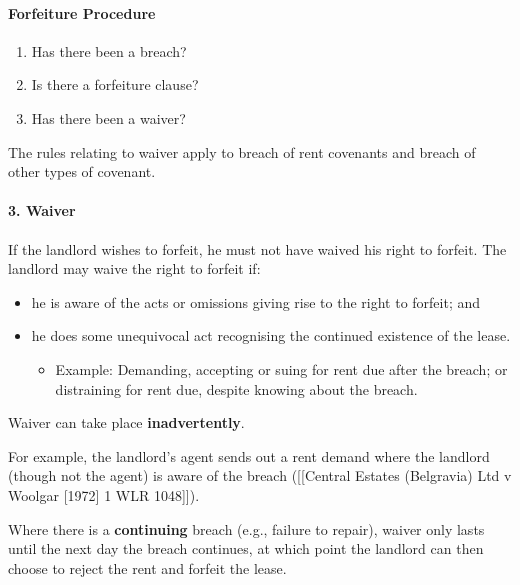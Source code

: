 \documentclass[
]{article}
\providecommand{\tightlist}{%
  \setlength{\itemsep}{0pt}\setlength{\parskip}{0pt}}
\begin{document}
\hypertarget{forfeiture-procedure}{%
\paragraph{Forfeiture Procedure}\label{forfeiture-procedure}}

\begin{enumerate}
\def\labelenumi{\arabic{enumi}.}
\tightlist
\item
  Has there been a breach?
\item
  Is there a forfeiture clause?
\item
  Has there been a waiver?
\end{enumerate}

The rules relating to waiver apply to breach of rent covenants and
breach of other types of covenant.

\hypertarget{waiver}{%
\paragraph{3. Waiver}\label{waiver}}

If the landlord wishes to forfeit, he must not have waived his right to
forfeit. The landlord may waive the right to forfeit if:

\begin{itemize}
\tightlist
\item
  he is aware of the acts or omissions giving rise to the right to
  forfeit; and
\item
  he does some unequivocal act recognising the continued existence of
  the lease.

  \begin{itemize}
  \tightlist
  \item
    Example: Demanding, accepting or suing for rent due after the
    breach; or distraining for rent due, despite knowing about the
    breach.
  \end{itemize}
\end{itemize}

Waiver can take place \textbf{inadvertently}.

For example, the landlord's agent sends out a rent demand where the
landlord (though not the agent) is aware of the breach ({[}{[}Central
Estates (Belgravia) Ltd v Woolgar {[}1972{]} 1 WLR 1048{]}{]}).

Where there is a \textbf{continuing} breach (e.g., failure to repair),
waiver only lasts until the next day the breach continues, at which
point the landlord can then choose to reject the rent and forfeit the
lease.
\end{document}
